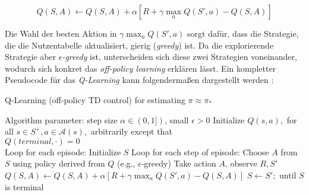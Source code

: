 \begin{equation}
    Q(S,A) \gets Q(S,A) + \alpha [R + \gamma \max_a Q(S',a) - Q(S,A)]
\end{equation}

Die Wahl der besten Aktion in $\gamma \max_a Q(S',a)$ sorgt dafür, dass die Strategie, die die Nutzentabelle aktualisiert, gierig (\textit{greedy}) ist. Da die explorierende Strategie aber $\epsilon$\textit{-greedy} ist, unterscheiden sich diese zwei Strategien voneinander, wodurch sich konkret das \textit{off-policy learning} erklären lässt. Ein kompletter Pseudocode für das \textit{Q-Learning} kann folgendermaßen dargestellt werden \cite[S.~131]{Sutton1998}:
\begin{algorithm}
    \caption{Q-Learning (off-policy TD control) for estimating $\pi \approx \pi_*$}
    \begin{algorithmic}[1]
        \State Algorithm parameter: step size $\alpha \in (0,1])$, small $\epsilon > 0$
        \State Initialize $Q(s,a),$ for all $s \in S^+, a \in \mathcal{A}(s),$ arbitrarily except that \\ $Q(terminal, \mathord{\cdot}) = 0$
        \\
        \State Loop for each episode:
        \Indent
            \State Initialize $S$
            \State Loop for each step of episode:
            \Indent
                \State Choose $A$ from $S$ using policy derived from $Q$ (e.g., $\epsilon$-greedy)
                \State Take action $A$, observe $R, S'$
                \State $Q(S,A) \gets Q(S,A) + \alpha [R + \gamma \max_a Q(S',a) - Q(S,A)]$
                \State $S \gets S';$
            \EndIndent
            \State until $S$ is terminal
        \EndIndent 
    \end{algorithmic}
\end{algorithm}
